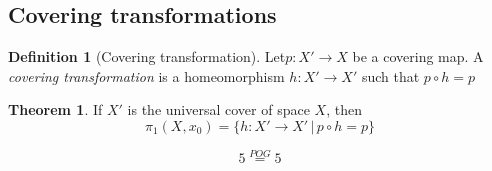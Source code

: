 \documentclass[a4paper,14pt]{extarticle}
\theoremstyle{definition}
\newtheorem*{theorem}{Theorem}
\newtheorem*{definition}{Definition}
\begin{document}
\subsection{Covering transformations}

\begin{definition}[Covering transformation]
  Let$p:X'\rightarrow X$ be a covering map. A \emph{covering transformation} is a homeomorphism $h:X'\rightarrow X'$ such that $p\circ h=p$
\end{definition}

\begin{theorem}
  If $X'$ is the universal cover of space $X$, then 
  \[\pi_1(X,x_0)=\{h:X'\rightarrow X'\,|\,p\circ h =p\}\]
\end{theorem}

\[5\overset{POG}{=}5\]
\end{document}
